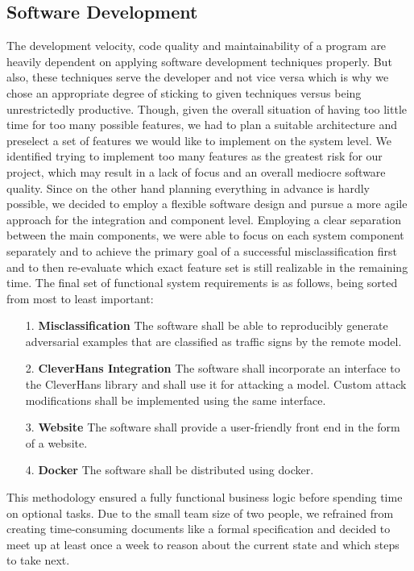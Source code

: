 \subsection{Software Development}\label{subsec:sw_development}
The development velocity, code quality and maintainability of a program are heavily dependent on applying software development techniques properly.
But also, these techniques serve the developer and not vice versa which is why we chose an appropriate degree of sticking to given techniques versus being unrestrictedly productive.
Though, given the overall situation of having too little time for too many possible features, we had to plan a suitable architecture and preselect a set of features we would like to implement on the system level.
We identified trying to implement too many features as the greatest risk for our project, which may result in a lack of focus and an overall mediocre software quality.
Since on the other hand planning everything in advance is hardly possible, we decided to employ a flexible software design and pursue a more agile approach for the integration and component level.
Employing a clear separation between the main components, we were able to focus on each system component separately and to achieve the primary goal of a successful misclassification first and to then re-evaluate which exact feature set is still realizable in the remaining time.
The final set of functional system requirements is as follows, being sorted from most to least important:
\begin{enumerate}
	\item[1.] \textbf{Misclassification}
	The software shall be able to reproducibly generate adversarial examples that are classified as traffic signs by the remote model.
	\item[2.] \textbf{CleverHans Integration}
	The software shall incorporate an interface to the CleverHans library and shall use it for attacking a model. Custom attack modifications shall be implemented using the same interface.
	\item[3.] \textbf{Website}
	The software shall provide a user-friendly front end in the form of a website.
	\item[4.] \textbf{Docker}
	The software shall be distributed using docker.
\end{enumerate}

This methodology ensured a fully functional business logic before spending time on optional tasks.
Due to the small team size of two people, we refrained from creating time-consuming documents like a formal specification and decided to meet up at least once a week to reason about the current state and which steps to take next.

